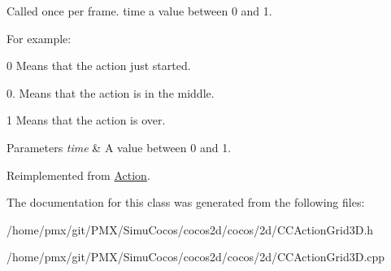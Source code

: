 Called once per frame. time a value between 0 and 1.

For example\+:
\begin{DoxyItemize}
\item 0 Means that the action just started.
\item 0. Means that the action is in the middle.
\item 1 Means that the action is over.
\end{DoxyItemize}


\begin{DoxyParams}{Parameters}
{\em time} & A value between 0 and 1. \\
\hline
\end{DoxyParams}


Reimplemented from \hyperlink{classAction_a937e646e63915e33ad05ba149bfcf239}{Action}.



The documentation for this class was generated from the following files\+:\begin{DoxyCompactItemize}
\item 
/home/pmx/git/\+P\+M\+X/\+Simu\+Cocos/cocos2d/cocos/2d/C\+C\+Action\+Grid3\+D.\+h\item 
/home/pmx/git/\+P\+M\+X/\+Simu\+Cocos/cocos2d/cocos/2d/C\+C\+Action\+Grid3\+D.\+cpp\end{DoxyCompactItemize}
